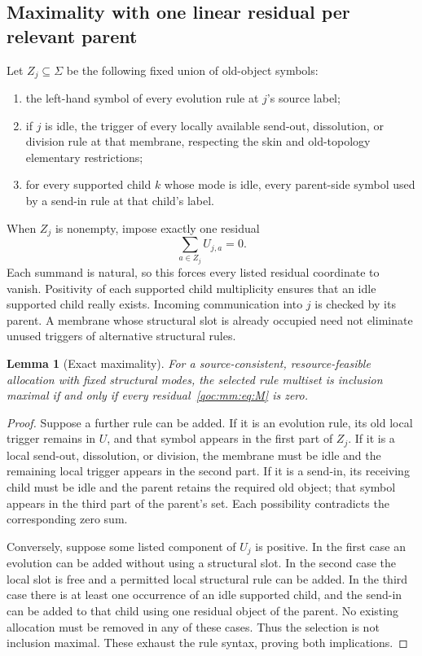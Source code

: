 \documentclass[11pt,letterpaper]{article}
\newtheorem{lemma}[theorem]{Lemma}
\theoremstyle{definition}
\theoremstyle{remark}
\begin{document}
\subsection{Maximality with one linear residual per relevant parent}\label{qoc:mm:sec:maximality}
Let $Z_j\subseteq\Sigma$ be the following fixed union of old-object symbols:
\begin{enumerate}
\item the left-hand symbol of every evolution rule at $j$'s source label;
\item if $j$ is idle, the trigger of every locally available send-out, dissolution, or division rule at that membrane, respecting the skin and old-topology elementary restrictions;
\item for every supported child $k$ whose mode is idle, every parent-side symbol used by a send-in rule at that child's label.
\end{enumerate}
When $Z_j$ is nonempty, impose exactly one residual
\begin{equation}\tag{M}\label{qoc:mm:eq:M}
 \sum_{a\in Z_j}U_{j,a}=0.
\end{equation}
Each summand is natural, so this forces every listed residual coordinate to vanish. Positivity of each supported child multiplicity ensures that an idle supported child really exists. Incoming communication into $j$ is checked by its parent. A membrane whose structural slot is already occupied need not eliminate unused triggers of alternative structural rules.

\begin{lemma}[Exact maximality]\label{qoc:mm:lem:max}
For a source-consistent, resource-feasible allocation with fixed structural modes, the selected rule multiset is inclusion maximal if and only if every residual~\eqref{qoc:mm:eq:M} is zero.
\end{lemma}
\begin{proof}
Suppose a further rule can be added. If it is an evolution rule, its old local trigger remains in $U$, and that symbol appears in the first part of $Z_j$. If it is a local send-out, dissolution, or division, the membrane must be idle and the remaining local trigger appears in the second part. If it is a send-in, its receiving child must be idle and the parent retains the required old object; that symbol appears in the third part of the parent's set. Each possibility contradicts the corresponding zero sum.

Conversely, suppose some listed component of $U_j$ is positive. In the first case an evolution can be added without using a structural slot. In the second case the local slot is free and a permitted local structural rule can be added. In the third case there is at least one occurrence of an idle supported child, and the send-in can be added to that child using one residual object of the parent. No existing allocation must be removed in any of these cases. Thus the selection is not inclusion maximal. These exhaust the rule syntax, proving both implications.
\end{proof}
\end{document}
